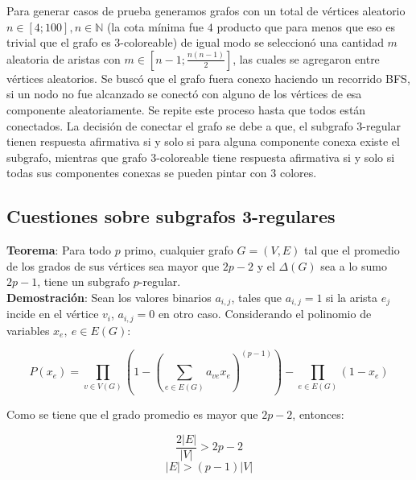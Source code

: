 \documentclass{article}
\begin{document}
Para generar casos de prueba generamos grafos con un total de v\'ertices aleatorio $n \in [4;100], n \in \mathbb{N}$ (la cota m\'inima fue $4$ producto que para menos que eso es trivial que el grafo es $3$-coloreable) 
de igual modo se seleccion\'o una cantidad $m$ aleatoria de aristas con $m \in [n-1; \frac{n(n-1)}{2}]$, las cuales se agregaron entre v\'ertices aleatorios. Se busc\'o que el grafo fuera conexo haciendo un recorrido BFS, si un nodo no fue alcanzado 
se conect\'o con alguno de los v\'ertices de esa componente aleatoriamente. Se repite este proceso hasta que todos est\'an conectados. La decisi\'on de conectar el grafo se debe a que, el subgrafo $3$-regular tienen respuesta afirmativa 
si y solo si para alguna componente conexa existe el subgrafo, mientras que grafo $3$-coloreable tiene respuesta afirmativa si y solo si todas sus componentes conexas se pueden pintar con $3$ colores.\\ 







\subsection*{Cuestiones sobre subgrafos 3-regulares}

\textbf{Teorema}: Para todo $p$ primo, cualquier grafo $G=(V,E)$ tal que el promedio de los grados de sus v\'ertices sea mayor que 
$2p-2$ y el $\Delta(G)$ sea a lo sumo $2p -1$, tiene un subgrafo $p$-regular.\\ 

\textbf{Demostraci\'on}: Sean los valores binarios $a_{i,j}$, tales que $a_{i,j} = 1$ si la arista $e_{j}$ incide en el v\'ertice $v_i$, $a_{i,j} = 0$ en otro caso.
Considerando el polinomio de variables $x_e,~ e\in E(G)$:

$$P(x_e) = \prod_{v \in V(G)} \left( 1 - \left(\sum_{e \in E(G)} a_{ve} x_e\right)^{(p-1)}\right) - \prod_{e \in E(G)} (1 - x_e)$$ 

Como se tiene que el grado promedio es mayor que $2p-2$, entonces: 

$$\frac{2|E|}{|V|} > 2p-2 $$
$$|E| > (p-1)|V|$$
\end{document}

